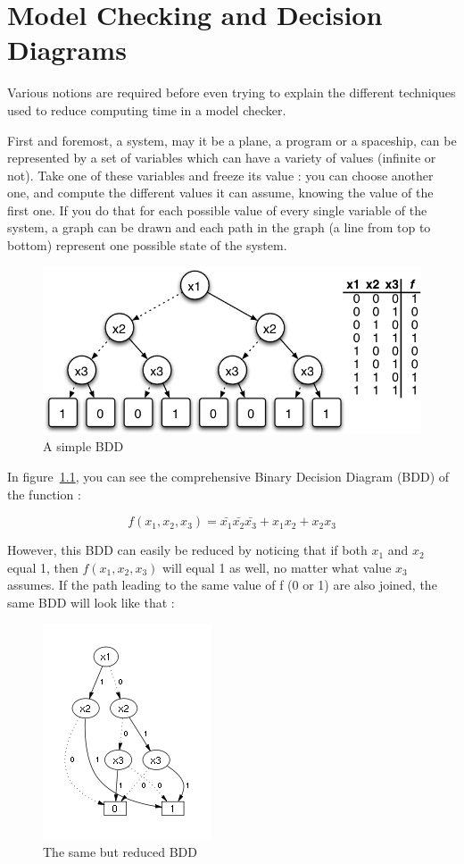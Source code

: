 \documentclass[12pt]{report}
\begin{document}
\chapter{Model Checking and Decision Diagrams}

Various notions are required before even trying to explain the different techniques used to reduce computing time in a model checker.

First and foremost, a system, may it be a plane, a program or a spaceship, can be represented by a set of variables which can have a variety of values (infinite or not). Take one of these variables and freeze its value : you can choose another one, and compute the different values it can assume, knowing the value of the first one. If you do that for each possible value of every single variable of the system, a graph can be drawn and each path in the graph (a line from top to bottom) represent one possible state of the system.

\begin{figure}[!h]
  \centering
  \includegraphics[scale=0.5]{basic_bdd.jpg}
  \caption{A simple BDD}
  \label{basic_bdd}
\end{figure}

In figure~\ref{basic_bdd}, you can see the comprehensive Binary Decision Diagram (BDD) of the function :

\[f(x_1,x_2,x_3) = \bar{x_1}\bar{x_2}\bar{x_3} + x_1x_2 + x_2x_3\]

However, this BDD can easily be reduced by noticing that if both $x_1$ and $x_2$ equal 1, then $f(x_1, x_2, x_3)$ will equal 1 as well, no matter what value $x_3$ assumes. If the path leading to the same value of f (0 or 1) are also joined, the same BDD will look like that :

\begin{figure}[!h]
  \centering
  \includegraphics[scale=0.8]{compact_bdd.jpg}
  \caption{The same but reduced BDD}
  \label{compact_bdd}
\end{figure}
\end{document}
